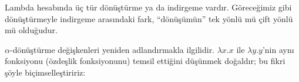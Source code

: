 \documentclass[../../../include/open-logic-section]{subfiles}
\begin{document}

Lambda hesabında üç tür dönüştürme ya da indirgeme vardır. Göreceğimiz gibi
dönüştürmeyle indirgeme arasındaki fark, ``dönüşümün'' tek yönlü mü çift
yönlü mü olduğudur.

$\alpha$-dönüştürme değişkenleri yeniden adlandırmakla ilgilidir.
$\lambda x.x$ ile $\lambda y.y$'nin aynı fonksiyonu (özdeşlik fonksiyonunu)
temsil ettiğini düşünmek doğaldır; bu fikri şöyle biçimselleştiririz:
\end{document}

